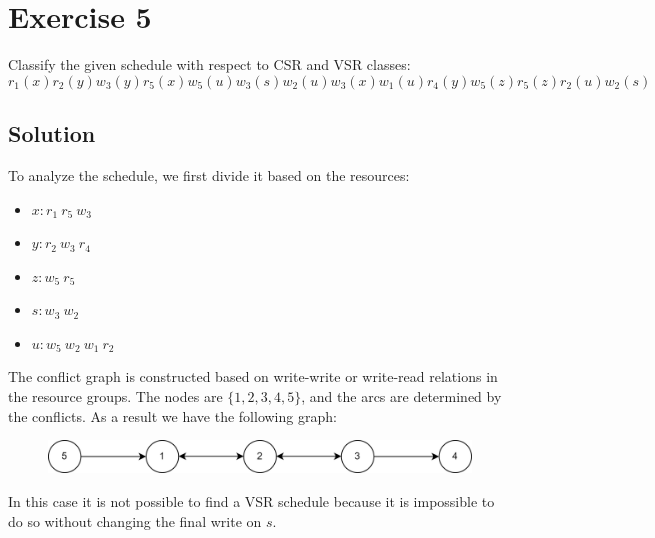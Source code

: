\section{Exercise 5}

Classify the given schedule with respect to CSR and VSR classes:
\[r_1(x) r_2(y) w_3(y) r_5(x) w_5(u) w_3(s) w_2(u) w_3(x) w_1(u) r_4(y) w_5(z) r_5(z) r_2(u) w_2(s)\]

\subsection*{Solution}
To analyze the schedule, we first divide it based on the resources:
\begin{itemize}
    \item $x: r_1 \: r_5 \: w_3$
    \item $y: r_2 \: w_3 \: r_4$
    \item $z: w_5 \: r_5$
    \item $s: w_3 \: w_2$
    \item $u: w_5 \: w_2 \: w_1 \: r_2$
\end{itemize}
The conflict graph is constructed based on write-write or write-read relations in the resource groups. 
The nodes are $\{1,2,3,4,5\}$, and the arcs are determined by the conflicts. 
As a result we have the following graph:
\begin{figure}[H]
    \centering
    \includegraphics[width=1.0\linewidth]{images/conflictgraph2.png}
\end{figure}
In this case it is not possible to find a VSR schedule because it is impossible to do so without changing the final write on $s$. 